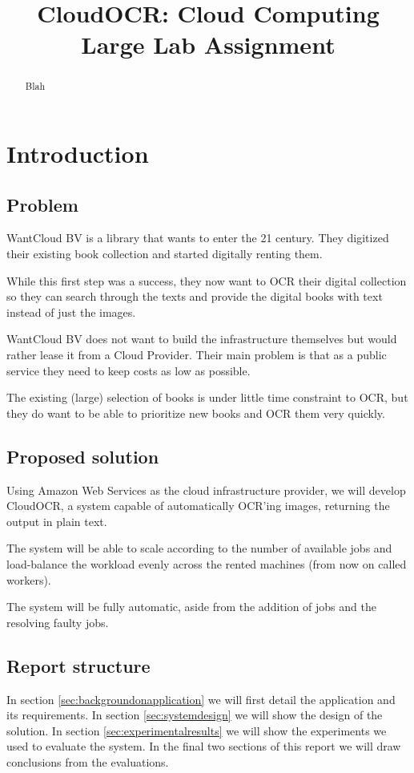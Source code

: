 \documentclass[a4paper]{IEEEtran}
\title{CloudOCR: Cloud Computing Large Lab Assignment}
\author{
	\IEEEauthorblockN{Tiago Mota \\}
	\IEEEauthorblockA{Email: neozflux@gmail.com \\}
	\and
	\IEEEauthorblockN{Eddy Bertoluzzo \\}
	\IEEEauthorblockA{Email: eddy.bertoluzzo@gmail.com \\}
	\and
	\IEEEauthorblockN{David Hoepelman\\}
	\IEEEauthorblockA{Email: dhoepelman@gmail.com\\}
	\and
	\IEEEauthorblockN{Course instructor: Alexandru Iosup\\}
	\IEEEauthorblockA{Email: A.Iosup@tudelft.nl \\}
}
\begin{document}
\maketitle

\begin{abstract}

Blah
\end{abstract}

\section{Introduction}


\subsection{Problem}

WantCloud BV is a library that wants to enter the 21 century. They digitized their existing book collection and started digitally renting them.

While this first step was a success, they now want to OCR their digital collection so they can search through the texts and provide the digital books with text instead of just the images.

WantCloud BV does not want to build the infrastructure themselves but would rather lease it from a Cloud Provider. Their main problem is that as a public service they need to keep costs as low as possible.

The existing (large) selection of books is under little time constraint to OCR, but they do want to be able to prioritize new books and OCR them very quickly.

\subsection{Proposed solution}
Using Amazon Web Services as the cloud infrastructure provider, we will develop CloudOCR, a system capable of automatically OCR'ing images, returning the output in plain text.

The system will be able to scale according to the number of available jobs and load-balance the workload evenly across the rented machines (from now on called workers).

The system will be fully automatic, aside from the addition of jobs and the resolving faulty jobs.

\subsection{Report structure}
In section \ref{sec:backgroundonapplication} we will first detail the application and its requirements. In section \ref{sec:systemdesign} we will show the design of the solution. In section \ref{sec:experimentalresults} we will show the experiments we used to evaluate the system.
In the final two sections of this report we will draw conclusions from the evaluations.
\end{document}
